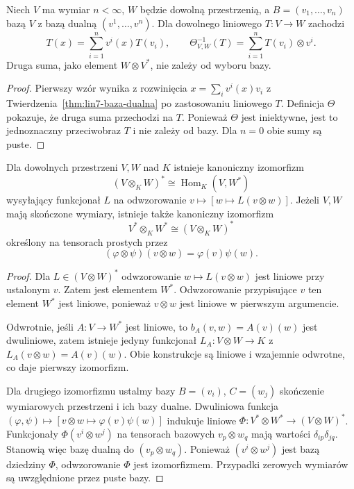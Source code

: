 \begin{wniosek}
\label{cor:lin10-hom-rozwiniecie}
Niech \(V\) ma wymiar \(n<\infty\),
\(W\) będzie dowolną przestrzenią,
a \(B=(v_1,\ldots,v_n)\)
bazą \(V\) z bazą dualną
\((v^1,\ldots,v^n)\).
Dla dowolnego liniowego
\(T\colon V\to W\) zachodzi
\[
 T(x)=\sum_{i=1}^n v^i(x)T(v_i),
 \qquad
 \Theta_{V,W}^{-1}(T)
 =\sum_{i=1}^n T(v_i)\otimes v^i.
\]
Druga suma, jako element
\(W\otimes V^*\), nie zależy
od wyboru bazy.
\end{wniosek}
\begin{proof}
Pierwszy wzór wynika z
rozwinięcia
\(x=\sum_i v^i(x)v_i\)
z
Twierdzenia~\ref{thm:lin7-baza-dualna}
po zastosowaniu liniowego \(T\).
Definicja \(\Theta\) pokazuje,
że druga suma przechodzi
na \(T\). Ponieważ
\(\Theta\) jest iniektywne,
jest to jednoznaczny przeciwobraz
\(T\) i nie zależy od bazy.
Dla \(n=0\) obie sumy są puste.
\end{proof}

\begin{twierdzenie}
\label{thm:lin10-dual}
Dla dowolnych przestrzeni
\(V,W\) nad \(K\) istnieje
kanoniczny izomorfizm
\[
 (V\otimes_KW)^*
 \cong\operatorname{Hom}_K(V,W^*)
\]
wysyłający funkcjonał \(L\)
na odwzorowanie
\(v\mapsto[w\mapsto L(v\otimes w)]\).
Jeżeli \(V,W\) mają skończone
wymiary, istnieje także
kanoniczny izomorfizm
\[
 V^*\otimes_KW^*
 \cong (V\otimes_KW)^*
\]
określony na tensorach prostych
przez
\[
 (\varphi\otimes\psi)(v\otimes w)
 =\varphi(v)\psi(w).
\]
\end{twierdzenie}
\begin{proof}
Dla \(L\in(V\otimes W)^*\)
odwzorowanie \(w\mapsto L(v\otimes w)\)
jest liniowe przy ustalonym \(v\).
Zatem jest elementem \(W^*\).
Odwzorowanie przypisujące \(v\)
ten element \(W^*\) jest liniowe,
ponieważ \(v\otimes w\)
jest liniowe w pierwszym argumencie.

Odwrotnie, jeśli \(A\colon V\to W^*\)
jest liniowe, to
\(b_A(v,w)=A(v)(w)\)
jest dwuliniowe, zatem istnieje
jedyny funkcjonał
\(L_A\colon V\otimes W\to K\)
z \(L_A(v\otimes w)=A(v)(w)\).
Obie konstrukcje są liniowe
i wzajemnie odwrotne,
co daje pierwszy izomorfizm.

Dla drugiego izomorfizmu
ustalmy bazy \(B=(v_i)\),
\(C=(w_j)\) skończenie
wymiarowych przestrzeni
i ich bazy dualne.
Dwuliniowa funkcja
\((\varphi,\psi)\mapsto
[v\otimes w\mapsto\varphi(v)\psi(w)]\)
indukuje liniowe
\(\Phi\colon V^*\otimes W^*\to
(V\otimes W)^*\).
Funkcjonały
\(\Phi(v^i\otimes w^j)\)
na tensorach bazowych
\(v_p\otimes w_q\)
mają wartości
\(\delta_{ip}\delta_{jq}\).
Stanowią więc bazę dualną
do \((v_p\otimes w_q)\).
Ponieważ \((v^i\otimes w^j)\)
jest bazą dziedziny \(\Phi\),
odwzorowanie \(\Phi\)
jest izomorfizmem.
Przypadki zerowych wymiarów
są uwzględnione przez puste bazy.
\end{proof}

